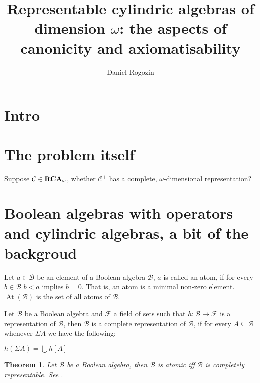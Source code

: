 \documentclass[a4paper]{article}
\author{Daniel Rogozin}
\date{}
\title{Representable cylindric algebras of dimension $\omega$: the aspects of canonicity and axiomatisability}
\theoremstyle{defin}
\theoremstyle{theorem}
\newtheorem{theorem}{Theorem}
\theoremstyle{prop}
\theoremstyle{lemma}
\theoremstyle{fact}
\theoremstyle{ex}
\theoremstyle{col}
\begin{document}
\maketitle

\section{Intro}

\section{The problem itself}

Suppose $\mathcal{C} \in {\bf RCA}_{\omega}$, whether $\mathcal{C}^{+}$ has a complete, $\omega$-dimensional representation? \cite{hirsch2002relation}

\section{Boolean algebras with operators and cylindric algebras, a bit of the backgroud}

Let $a \in \mathcal{B}$ be an element of a Boolean algebra $\mathcal{B}$, $a$ is called an atom, if for every $b \in \mathcal{B}$
$b < a$ implies $b = 0$. That is, an atom is a minimal non-zero element. $\operatorname{At}(\mathcal{B})$ is the set of all atoms
of $\mathcal{B}$.

Let $\mathcal{B}$ be a Boolean algebra and $\mathcal{F}$ a field of sets such that $h : \mathcal{B} \to \mathcal{F}$ is a
representation of $\mathcal{B}$, then $\mathcal{B}$ is a complete representation of $\mathcal{B}$, if for every
$A \subseteq \mathcal{B}$ whenever $\Sigma A$ we have the following:
\begin{center}
  $h(\Sigma A) = \bigcup h[A]$
\end{center}

\begin{theorem} \label{completeboolean}
  Let $\mathcal{B}$ be a Boolean algebra, then $\mathcal{B}$ is atomic iff $\mathcal{B}$ is completely representable. See \cite[Corollary 6]{hirsch1997complete}.
\end{theorem}
\end{document}
